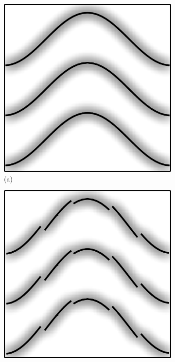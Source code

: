 \begin{figure}[ht!]
    \centering
    \begin{subfigure}[b]{.3\textwidth}
        \centering
        \includegraphics[scale=.08]{figures/Shatter/3Lines.png}
        \caption*{(a)}
    \end{subfigure}
    \begin{subfigure}[b]{.3\textwidth}
        \centering
        \includegraphics[scale=.08]{figures/Shatter/15Lines.png}

\end{subfigure}
\end{figure}
